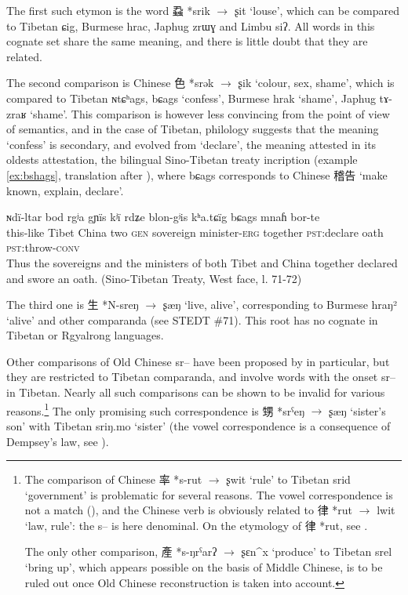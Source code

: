 \documentclass[oldfontcommands,oneside,a4paper,11pt]{article}
\newcommand{\ipa}[1]{{\phon #1}} %
\newcommand{\zh}[1]{{\cn #1}}
\newcommand{\archaic}[4]{\zh{#1} *\ipa{#2} $\rightarrow$ \ipa{#3} `#4'}
\begin{document}
The first such etymon is the word \archaic{蝨}{srik}{ʂit}{louse}, which can be compared to Tibetan \ipa{ɕig}, Burmese \ipa{hrac}, Japhug \ipa{zrɯɣ} and Limbu \ipa{siʔ}. All words in this cognate set share the same meaning, and there is little doubt that they are related.

The second comparison is Chinese \archaic{色}{srək}{ʂik}{colour, sex, shame}, which is compared to Tibetan \ipa{ɴtɕʰags}, \ipa{bɕags} `confess', Burmese \ipa{hrak} `shame', Japhug \ipa{tɤ-zraʁ} `shame'. This comparison is however less convincing from the point of view of semantics, and in the case of Tibetan, philology suggests that the meaning `confess' is secondary, and evolved from `declare', the meaning attested in its oldests attestation, the bilingual Sino-Tibetan treaty incription (example \ref{ex:bshags}, translation after \citealt[40,80]{licoblin87}), where 	\ipa{bɕags} corresponds to Chinese \zh{稽告} `make known, explain, declare'.


\begin{exe}
\ex \label{ex:bshags}
\gll
\ipa{ɴdï-ltar} 	\ipa{bod} 	\ipa{rgʲa} 	\ipa{gɲïs} 	\ipa{kʲï} 	\ipa{rdʑe} \ipa{blon-gʲis} 	\ipa{kʰa.tɕïg} 	\ipa{bɕags} 	\ipa{mnaɦ} 	\ipa{bor-te} \\
this-like Tibet China two \textsc{gen} sovereign minister-\textsc{erg} together \textsc{pst}:declare oath \textsc{pst}:throw-\textsc{conv} \\
\glt Thus the sovereigns and the ministers of both Tibet and China together declared and swore an oath. (Sino-Tibetan Treaty, West face, l. 71-72)
\end{exe}

The third one is \archaic{生}{N-sreŋ}{ʂæŋ}{live, alive}, corresponding to Burmese \ipa{hraŋ²} `alive' and other comparanda (see STEDT \#71). This root has no cognate in Tibetan or Rgyalrong languages.

Other comparisons of Old Chinese \ipa{*sr--} have been proposed by \citet{coblin86handlist} in particular, but they are restricted to Tibetan comparanda, and involve words with the onset \ipa{sr--} in Tibetan. Nearly all such comparisons can be shown to be invalid for various reasons.\footnote{The comparison of Chinese \archaic{率}{s-rut}{ʂwit}{rule} to Tibetan \ipa{srid} `government' is problematic for several reasons. The vowel correspondence is not a match (\citealt{gong95st}), and the Chinese verb is obviously related to \archaic{律}{rut}{lwit}{law, rule}: the \ipa{s--} is here denominal. On the etymology of \zh{律} *\ipa{rut}, see \citet{sagart14lv}.

The only other comparison, \archaic{產}{s-ŋrˁarʔ}{ʂɛn^x}{produce} to Tibetan \ipa{srel} `bring up', which appears possible on the basis of Middle Chinese, is to be ruled out once Old Chinese reconstruction is taken into account.
}
The only promising such correspondence is \archaic{甥}{srˁeŋ}{ʂæŋ}{sister's son} with Tibetan \ipa{sriŋ.mo} `sister' (the vowel correspondence is a consequence of Dempsey's law, see \citealt{hill14dempsey}).
\end{document}
